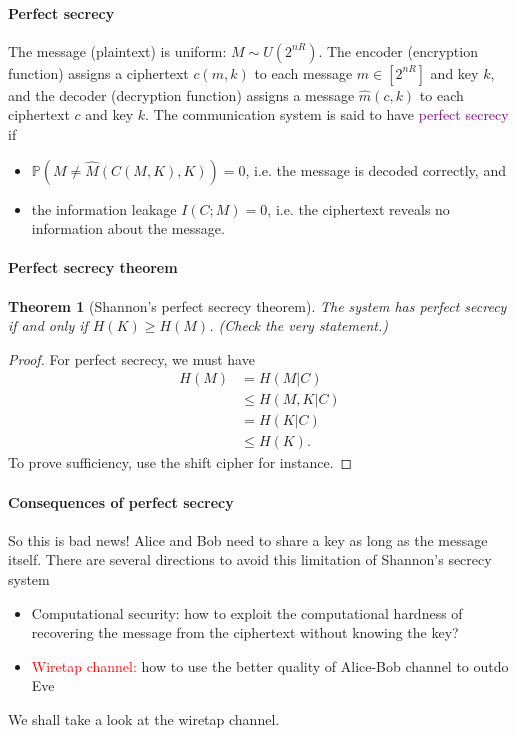 \documentclass[a4paper, 11pt, openany]{book}
\numberwithin{equation}{section}
\theoremstyle{plain}
\newtheorem{theorem}	[equation]	{Theorem}
\theoremstyle{definition}
\newcommand{\probability}{\mathbb{P}}
\newcommand{\Important}[1]{\textcolor{red}{#1}}
\newcommand{\Define}[1]{\textcolor{purple}{#1}}
\begin{document}
\paragraph{Perfect secrecy}

The message (plaintext) is uniform: $M \sim U(2^{nR})$. The encoder (encryption function) assigns a ciphertext $c(m,k)$ to each message $m \in [2^{nR}]$ and key $k$, and the decoder (decryption function) assigns a message $\hat{m}(c,k)$ to each ciphertext $c$ and key $k$. The communication system is said to have \Define{perfect secrecy} if
\begin{itemize}
	\item $\probability( M \ne \hat{M}( C(M,K), K ) ) = 0$, i.e. the message is decoded correctly, and
	
	\item the information leakage $I(C;M) = 0$, i.e. the ciphertext reveals no information about the message.
\end{itemize}



\paragraph{Perfect secrecy theorem}

\begin{theorem}[Shannon's perfect secrecy theorem]
The system has perfect secrecy if and only if $H(K) \ge H(M)$. (Check the very statement.)
\end{theorem}

\begin{proof}
For perfect secrecy, we must have
\begin{align*}
	H(M) &= H(M | C)\\
	&\le H(M, K | C)\\
	&= H(K | C)\\
	&\le H(K).
\end{align*} 
To prove sufficiency, use the shift cipher for instance.
\end{proof}


\paragraph{Consequences of perfect secrecy}
So this is bad news! Alice and Bob need to share a key as long as the message
itself. There are several directions to avoid this limitation of Shannon's secrecy system
\begin{itemize}
    \item Computational security: how to exploit the computational hardness of
    recovering the message from the ciphertext without knowing the key?
    
    \item \Important{Wiretap channel:} how to use the better quality of Alice-Bob channel to outdo
    Eve
\end{itemize}
We shall take a look at the wiretap channel.
\end{document}
